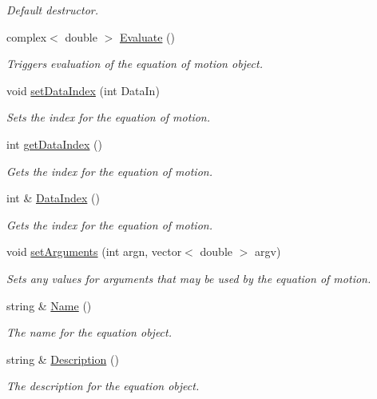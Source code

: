 \begin{DoxyCompactItemize}
\begin{DoxyCompactList}\small\item\em Default destructor. \end{DoxyCompactList}\item 
complex$<$ double $>$ \hyperlink{class_equationof_motion_a7198b4661f6c0a4c1f280863228bd63c}{Evaluate} ()
\begin{DoxyCompactList}\small\item\em Triggers evaluation of the equation of motion object. \end{DoxyCompactList}\item 
void \hyperlink{class_equationof_motion_a5a8674f3d8715973fa0affc162ae677c}{set\-Data\-Index} (int Data\-In)
\begin{DoxyCompactList}\small\item\em Sets the index for the equation of motion. \end{DoxyCompactList}\item 
int \hyperlink{class_equationof_motion_a45052d6a9814ffa899d1824f5d8e8cee}{get\-Data\-Index} ()
\begin{DoxyCompactList}\small\item\em Gets the index for the equation of motion. \end{DoxyCompactList}\item 
int \& \hyperlink{class_equationof_motion_a800370248e44d12120e541b3409071ca}{Data\-Index} ()
\begin{DoxyCompactList}\small\item\em Gets the index for the equation of motion. \end{DoxyCompactList}\item 
void \hyperlink{class_equationof_motion_ad93006b4658c7b2809770866511581ad}{set\-Arguments} (int argn, vector$<$ double $>$ argv)
\begin{DoxyCompactList}\small\item\em Sets any values for arguments that may be used by the equation of motion. \end{DoxyCompactList}\item 
string \& \hyperlink{class_equationof_motion_a5ec937219e70f278a8f2271b7cdb38f2}{Name} ()
\begin{DoxyCompactList}\small\item\em The name for the equation object. \end{DoxyCompactList}\item 
string \& \hyperlink{class_equationof_motion_a347e77f27a30636e25e6c9eb1fec7b2e}{Description} ()
\begin{DoxyCompactList}\small\item\em The description for the equation object. \end{DoxyCompactList}\end{DoxyCompactItemize}
